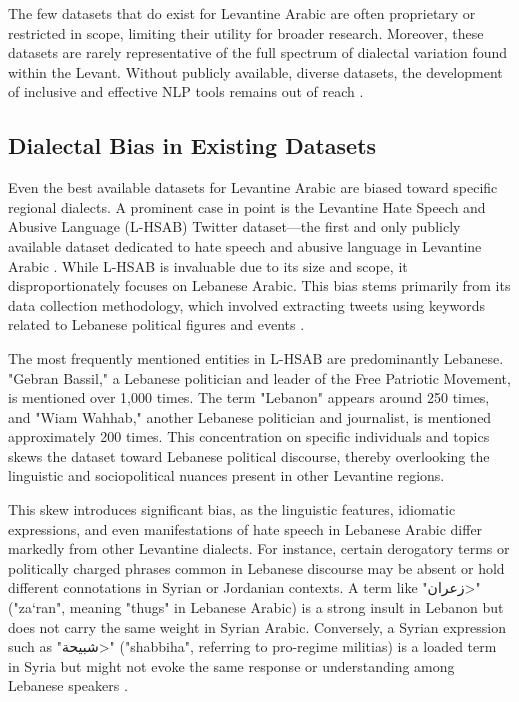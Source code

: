 \documentclass[11pt]{article}
\begin{document}
The few datasets that do exist for Levantine Arabic are often proprietary or restricted in scope, limiting their utility for broader research. Moreover, these datasets are rarely representative of the full spectrum of dialectal variation found within the Levant. Without publicly available, diverse datasets, the development of inclusive and effective NLP tools remains out of reach \citep{barocas-hardt-narayanan}.

\subsection{Dialectal Bias in Existing Datasets}

Even the best available datasets for Levantine Arabic are biased toward specific regional dialects. A prominent case in point is the Levantine Hate Speech and Abusive Language (L-HSAB) Twitter dataset—the first and only publicly available dataset dedicated to hate speech and abusive language in Levantine Arabic \citep{mulki-etal-2019-l}. While L-HSAB is invaluable due to its size and scope, it disproportionately focuses on Lebanese Arabic. This bias stems primarily from its data collection methodology, which involved extracting tweets using keywords related to Lebanese political figures and events \citep{f5a0fc6c-286b-3484-9927-c1949a72ae5c}.

The most frequently mentioned entities in L-HSAB are predominantly Lebanese. "Gebran Bassil," a Lebanese politician and leader of the Free Patriotic Movement, is mentioned over 1,000 times. The term "Lebanon" appears around 250 times, and "Wiam Wahhab," another Lebanese politician and journalist, is mentioned approximately 200 times. This concentration on specific individuals and topics skews the dataset toward Lebanese political discourse, thereby overlooking the linguistic and sociopolitical nuances present in other Levantine regions.

This skew introduces significant bias, as the linguistic features, idiomatic expressions, and even manifestations of hate speech in Lebanese Arabic differ markedly from other Levantine dialects. For instance, certain derogatory terms or politically charged phrases common in Lebanese discourse may be absent or hold different connotations in Syrian or Jordanian contexts. A term like "\<زعران>" ("za‘ran", meaning "thugs" in Lebanese Arabic) is a strong insult in Lebanon but does not carry the same weight in Syrian Arabic. Conversely, a Syrian expression such as "\<شبيحة>" ("shabbiha", referring to pro-regime militias) is a loaded term in Syria but might not evoke the same response or understanding among Lebanese speakers \citep{doi:10.1177/2633002420907771}. 
\end{document}
